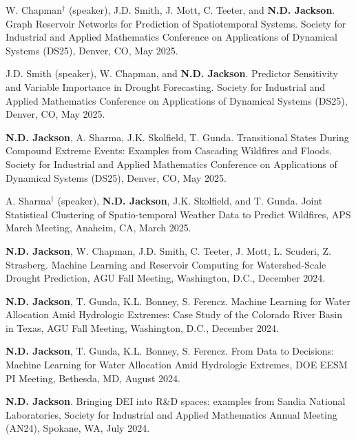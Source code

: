 \documentclass{article}[12pt]
\begin{document}
\begin{etaremune}[]
		\item W. Chapman$^{\dagger}$ (speaker), J.D. Smith, J. Mott, C. Teeter, and \textbf{N.D. Jackson}. Graph Reservoir Networks for Prediction of Spatiotemporal Systems. Society for Industrial and Applied Mathematics Conference on Applications of Dynamical Systems (DS25), Denver, CO, May 2025. 
		
		\item J.D. Smith (speaker), W. Chapman, and \textbf{N.D. Jackson}. Predictor Sensitivity and Variable Importance in Drought Forecasting. Society for Industrial and Applied Mathematics Conference on Applications of Dynamical Systems (DS25), Denver, CO, May 2025. 
		
		\item \textbf{N.D. Jackson}, A. Sharma, J.K. Skolfield, T. Gunda. Transitional States During Compound Extreme Events: Examples from Cascading Wildfires and Floods. Society for Industrial and Applied Mathematics Conference on Applications of Dynamical Systems (DS25), Denver, CO, May 2025. 
		
		\item A. Sharma$^{\dagger}$ (speaker), \textbf{N.D. Jackson}, J.K. Skolfield, and T. Gunda. Joint Statistical Clustering of Spatio-temporal Weather Data to Predict Wildfires, APS March Meeting, Anaheim, CA, March 2025. 
		
		\item \textbf{N.D. Jackson}, W. Chapman, J.D. Smith, C. Teeter, J. Mott, L. Scuderi, Z. Strasberg. Machine Learning and Reservoir Computing for Watershed-Scale Drought Prediction, AGU Fall Meeting, Washington, D.C., December 2024. 
		
		\item \textbf{N.D. Jackson}, T. Gunda, K.L. Bonney, S. Ferencz. Machine Learning for Water Allocation Amid Hydrologic Extremes: Case Study of the Colorado River Basin in Texas, AGU Fall Meeting, Washington, D.C., December 2024.
		
		\item \textbf{N.D. Jackson}, T. Gunda, K.L. Bonney, S. Ferencz. From Data to Decisions: Machine Learning for Water Allocation Amid Hydrologic Extremes, DOE EESM PI Meeting, Bethesda, MD, August 2024. 
		
		\item \textbf{N.D. Jackson}. Bringing DEI into R\&D spaces: examples from Sandia National Laboratories, Society for Industrial and Applied Mathematics Annual Meeting (AN24), Spokane, WA, July 2024. 
		

\end{etaremune}
\end{document}
